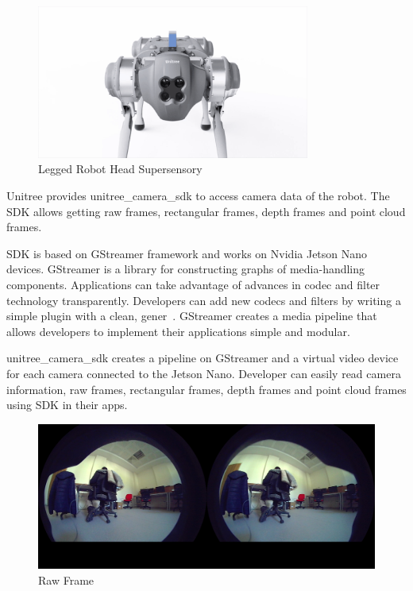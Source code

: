 \documentclass[12pt]{article}
\begin{document}
\begin{enumerate}
        \begin{figure}[H]
            \centering
            \includegraphics[width=0.8\textwidth]{RobotFront.png}
            \caption{Legged Robot Head Supersensory}
        \end{figure}

        Unitree provides unitree\_camera\_sdk to access camera data of the robot. The SDK allows getting raw frames, rectangular frames, depth frames and point cloud frames. 

        SDK is based on GStreamer framework and works on Nvidia Jetson Nano devices. GStreamer is a library for constructing graphs of media-handling components. Applications can take advantage of advances in codec and filter technology transparently. Developers can add new codecs and filters by writing a simple plugin with a clean, gener~\cite{gstreamer}. GStreamer creates a media pipeline that allows developers to implement their applications simple and modular. 

        unitree\_camera\_sdk creates a pipeline on GStreamer and a virtual video device for each camera connected to the Jetson Nano. Developer can easily read camera information, raw frames, rectangular frames, depth frames and point cloud frames using SDK in their apps. 

        \begin{figure}[H]
            \centering
            \includegraphics[width=\textwidth]{RawStereo.png}
            \caption{Raw Frame}
        \end{figure}


\end{enumerate}
\end{document}
